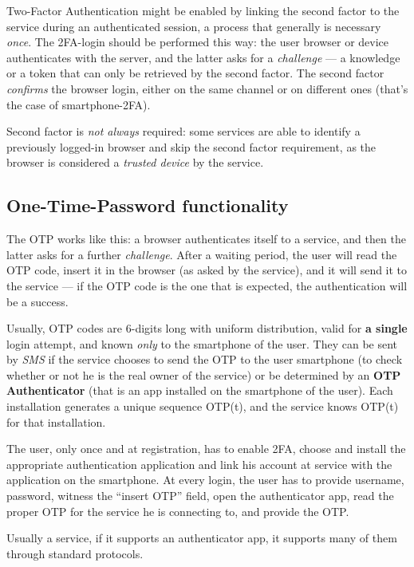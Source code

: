 \documentclass[10pt]{extreport}
\begin{document}
Two\--Factor Authentication might be enabled by linking the second factor to
the service during an authenticated session, a process that generally is
necessary \emph{once}. The 2FA\--login should be performed this way: the user
browser or device authenticates with the server, and the latter asks for a
\emph{challenge} --- a knowledge or a token that can only be retrieved by the
second factor. The second factor \emph{confirms} the browser login, either on
the same channel or on different ones (that's the case of smartphone\--2FA).

Second factor is \emph{not always} required: some services are able to identify
a previously logged\--in browser and skip the second factor requirement, as the
browser is considered a \emph{trusted device} by the service.

\subsection{One\--Time\--Password functionality}

The OTP works like this: a browser authenticates itself to a service, and then
the latter asks for a further \emph{challenge}. After a waiting period, the
user will read the OTP code, insert it in the browser (as asked by the
service), and it will send it to the service --- if the OTP code is the one that
is expected, the authentication will be a success.

Usually, OTP codes are 6\--digits long with uniform distribution, valid for
\textbf{a single} login attempt, and known \emph{only} to the smartphone of the
user. They can be sent by \emph{SMS} if the service chooses to send the OTP to
the user smartphone (to check whether or not he is the real owner of the
service) or be determined by an \textbf{OTP Authenticator} (that is an app
installed on the smartphone of the user). Each installation generates a unique
sequence OTP(t), and the service knows OTP(t) for that installation.

The user, only once and at registration, has to enable 2FA, choose and install
the appropriate authentication application and link his account at service with
the application on the smartphone. At every login, the user has to provide
username, password, witness the ``insert OTP'' field, open the authenticator
app, read the proper OTP for the service he is connecting to, and provide the
OTP.

Usually a service, if it supports an authenticator app, it supports many of
them through standard protocols. 
\end{document}
